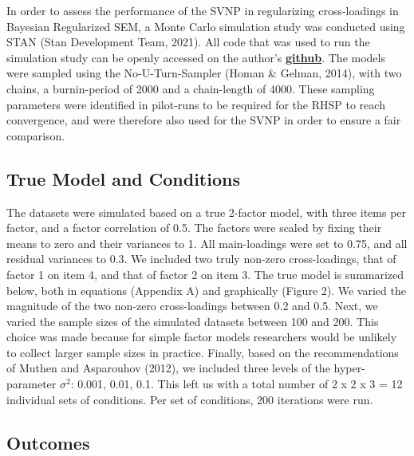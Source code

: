 \documentclass[
  english,
  man]{apa6}
\begin{document}
In order to assess the performance of the SVNP in regularizing cross-loadings in Bayesian Regularized SEM, a Monte Carlo simulation study was conducted using STAN (Stan Development Team, 2021). All code that was used to run the simulation study can be openly accessed on the author's \href{https://github.com/JMBKoch/1vs2StepBayesianRegSEM}{\textbf{github}}. The models were sampled using the No-U-Turn-Sampler (Homan \& Gelman, 2014), with two chains, a burnin-period of 2000 and a chain-length of 4000. These sampling parameters were identified in pilot-runs to be required for the RHSP to reach convergence, and were therefore also used for the SVNP in order to ensure a fair comparison.

\hypertarget{true-model-and-conditions}{%
\subsection{True Model and Conditions}\label{true-model-and-conditions}}

The datasets were simulated based on a true 2-factor model, with three items per factor, and a factor correlation of 0.5. The factors were scaled by fixing their means to zero and their variances to 1. All main-loadings were set to 0.75, and all residual variances to 0.3. We included two truly non-zero cross-loadings, that of factor 1 on item 4, and that of factor 2 on item 3. The true model is summarized below, both in equations (Appendix A) and graphically (Figure 2). We varied the magnitude of the two non-zero cross-loadings between 0.2 and 0.5. Next, we varied the sample sizes of the simulated datasets between 100 and 200. This choice was made because for simple factor models researchers would be unlikely to collect larger sample sizes in practice. Finally, based on the recommendations of Muthen and Asparouhov (2012), we included three levels of the hyper-parameter \(\sigma^2\): 0.001, 0.01, 0.1. This left us with a total number of 2 x 2 x 3 = 12 individual sets of conditions. Per set of conditions, 200 iterations were run.

\hypertarget{outcomes}{%
\subsection{Outcomes}\label{outcomes}}
\end{document}

